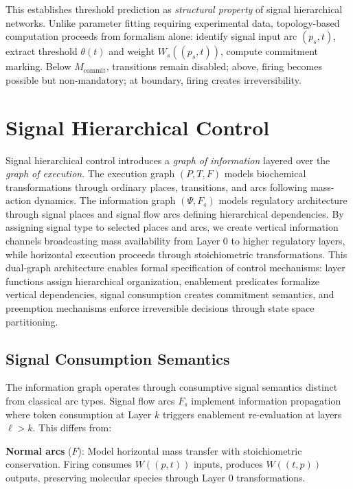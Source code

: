 \documentclass[10pt,letterpaper]{article}
\begin{document}
This establishes threshold prediction as \textit{structural property} of signal hierarchical networks. Unlike parameter fitting requiring experimental data, topology-based computation proceeds from formalism alone: identify signal input arc $(p_s,t)$, extract threshold $\theta(t)$ and weight $W_s((p_s,t))$, compute commitment marking. Below $M_{\text{commit}}$, transitions remain disabled; above, firing becomes possible but non-mandatory; at boundary, firing creates irreversibility.

\section{Signal Hierarchical Control}

Signal hierarchical control introduces a \textit{graph of information} layered over the \textit{graph of execution}. The execution graph $(P, T, F)$ models biochemical transformations through ordinary places, transitions, and arcs following mass-action dynamics. The information graph $(\Psi, F_s)$ models regulatory architecture through signal places and signal flow arcs defining hierarchical dependencies. By assigning signal type to selected places and arcs, we create vertical information channels broadcasting mass availability from Layer 0 to higher regulatory layers, while horizontal execution proceeds through stoichiometric transformations. This dual-graph architecture enables formal specification of control mechanisms: layer functions assign hierarchical organization, enablement predicates formalize vertical dependencies, signal consumption creates commitment semantics, and preemption mechanisms enforce irreversible decisions through state space partitioning.

\subsection{Signal Consumption Semantics}

The information graph operates through consumptive signal semantics distinct from classical arc types. Signal flow arcs $F_s$ implement information propagation where token consumption at Layer $k$ triggers enablement re-evaluation at layers $\ell > k$. This differs from:

\textbf{Normal arcs} ($F$): Model horizontal mass transfer with stoichiometric conservation. Firing consumes $W((p,t))$ inputs, produces $W((t,p))$ outputs, preserving molecular species through Layer 0 transformations.
\end{document}
